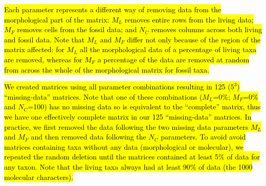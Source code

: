 \documentclass[12pt,letterpaper]{article}
\begin{document}
\hl{Each parameter represents a different way of removing data from the morphological part of the matrix: $M_L$ removes entire rows from the living data; $M_F$ removes cells from the fossil data; and $N_C$ removes columns across both living and fossil data.
Note that $M_L$ and $M_F$ differ not only because of the region of the matrix affected: for $M_L$ all the morphological data of a percentage of living taxa are removed, whereas for $M_F$ a percentage of the data are removed at random from across the whole of the morphological matrix for fossil taxa.}

\hl{We created matrices using all parameter combinations resulting in 125 ($5^3$) ``missing-data'' matrices.
Note that one of these combinations ($M_L$=0\%; $M_F$=0\% and $N_C$=100) has no missing data so is equivalent to the ``complete'' matrix, thus we have one effectively complete matrix in our 125 ``missing-data'' matrices.
In practice, we first removed the data following the two missing data parameters $M_L$ and $M_F$ and then removed data following the $N_C$ parameters.
To avoid avoid matrices containing taxa without any data (morphological or molecular), we repeated the random deletion until the matrices contained at least 5\% of data for any taxon.
Note that the living taxa always had at least 90\% of data (the 1000 molecular characters).}

\end{document}
